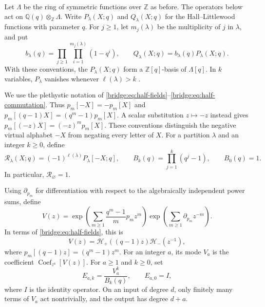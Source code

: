 \documentclass[12pt,reqno,a4paper]{amsart}
\numberwithin{equation}{section}
\numberwithin{figure}{section}
\theoremstyle{plain}
\theoremstyle{definition}
\DeclareMathOperator{\Coef}{Coef}
\begin{document}
Let $\Lambda$ be the ring of symmetric functions over $\mathbb Z$ as
before.  The operators below act on $\mathbb Q(q)\otimes_{\mathbb Z}\Lambda$.
Write $P_\lambda(X;q)$ and $Q_\lambda(X;q)$ for the Hall--Littlewood
functions with parameter $q$.
For $j\geq1$, let $m_j(\lambda)$ be the multiplicity of $j$ in
$\lambda$, and put
\[
 b_\lambda(q)=
 \prod_{j\geq1}\prod_{i=1}^{m_j(\lambda)}(1-q^i),
 \qquad Q_\lambda(X;q)=b_\lambda(q)P_\lambda(X;q).
\]
With these conventions, the $P_\lambda(X;q)$ form a $\mathbb Z[q]$-basis
of $\Lambda[q]$.  In $k$ variables, $P_\lambda$ vanishes whenever
$\ell(\lambda)>k$ \cite[Chapter~III, (2.5)--(2.7)]{Macdonald}.

We use the plethystic notation of
\eqref{bridge:eq:half-fields}--\eqref{bridge:eq:half-commutation}.
Thus $p_m[-X]=-p_m[X]$ and
$p_m[(q-1)X]=(q^m-1)p_m[X]$.  A scalar substitution $z\mapsto-z$
instead gives $p_m[(-z)X]=(-z)^mp_m[X]$.  These conventions
distinguish the negative virtual alphabet $-X$ from negating every
letter of $X$.
For a partition $\lambda$ and an integer $k\geq0$, define
\[
 \mathcal R_\lambda(X;q)
 =(-1)^{\ell(\lambda)}P_\lambda[-X;q],
 \qquad
 B_k(q)=\prod_{j=1}^k(q^j-1),
 \qquad B_0(q)=1.
\]
In particular, $\mathcal R_\varnothing=1$.

Using $\partial_{p_m}$ for differentiation with respect to the
algebraically independent power sums, define
\begin{equation}\label{c1:eq:jing-field}
 V(z)=
 \exp\left(\sum_{m\geq1}\frac{q^m-1}{m}p_mz^m\right)
\exp\left(\sum_{m\geq1}\partial_{p_m}z^{-m}\right).
\end{equation}
In terms of \eqref{bridge:eq:half-fields}, this is
\[
 V(z)=\mathcal H_+((q-1)z)\mathcal H_-(z^{-1}),
\]
where $p_m[(q-1)z]=(q^m-1)z^m$.
For an integer $a$, its mode $V_a$ is the coefficient $\Coef_{z^a}[V(z)]$.
For $a\geq1$ and $k\geq0$, set
\begin{equation}\label{c1:eq:normalized-modes}
 E_{a,k}=\frac{V_a^k}{B_k(q)},
 \qquad E_{a,0}=I,
\end{equation}
where $I$ is the identity operator.  On an input of degree $d$, only
finitely many terms of $V_a$ act nontrivially, and the output has degree
$d+a$.
\end{document}
